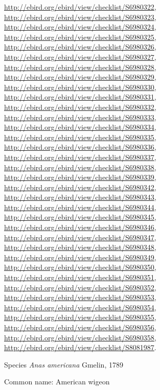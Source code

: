 \documentclass[9pt, article]{memoir}
\begin{document}
\begin{multicols}{2}
\url{http://ebird.org/ebird/view/checklist/S6980322}, 
\url{http://ebird.org/ebird/view/checklist/S6980323}, 
\url{http://ebird.org/ebird/view/checklist/S6980324}, 
\url{http://ebird.org/ebird/view/checklist/S6980325}, 
\url{http://ebird.org/ebird/view/checklist/S6980326}, 
\url{http://ebird.org/ebird/view/checklist/S6980327}, 
\url{http://ebird.org/ebird/view/checklist/S6980328}, 
\url{http://ebird.org/ebird/view/checklist/S6980329}, 
\url{http://ebird.org/ebird/view/checklist/S6980330}, 
\url{http://ebird.org/ebird/view/checklist/S6980331}, 
\url{http://ebird.org/ebird/view/checklist/S6980332}, 
\url{http://ebird.org/ebird/view/checklist/S6980333}, 
\url{http://ebird.org/ebird/view/checklist/S6980334}, 
\url{http://ebird.org/ebird/view/checklist/S6980335}, 
\url{http://ebird.org/ebird/view/checklist/S6980336}, 
\url{http://ebird.org/ebird/view/checklist/S6980337}, 
\url{http://ebird.org/ebird/view/checklist/S6980338}, 
\url{http://ebird.org/ebird/view/checklist/S6980339}, 
\url{http://ebird.org/ebird/view/checklist/S6980342}, 
\url{http://ebird.org/ebird/view/checklist/S6980343}, 
\url{http://ebird.org/ebird/view/checklist/S6980344}, 
\url{http://ebird.org/ebird/view/checklist/S6980345}, 
\url{http://ebird.org/ebird/view/checklist/S6980346}, 
\url{http://ebird.org/ebird/view/checklist/S6980347}, 
\url{http://ebird.org/ebird/view/checklist/S6980348}, 
\url{http://ebird.org/ebird/view/checklist/S6980349}, 
\url{http://ebird.org/ebird/view/checklist/S6980350}, 
\url{http://ebird.org/ebird/view/checklist/S6980351}, 
\url{http://ebird.org/ebird/view/checklist/S6980352}, 
\url{http://ebird.org/ebird/view/checklist/S6980353}, 
\url{http://ebird.org/ebird/view/checklist/S6980354}, 
\url{http://ebird.org/ebird/view/checklist/S6980355}, 
\url{http://ebird.org/ebird/view/checklist/S6980356}, 
\url{http://ebird.org/ebird/view/checklist/S6980358}, 
\url{http://ebird.org/ebird/view/checklist/S8081987}.

\vspace{6pt}\noindent\hspace{36pt}Species \textit{Anas americana} Gmelin, 1789


Common name: American wigeon


\end{multicols}
\end{document}
